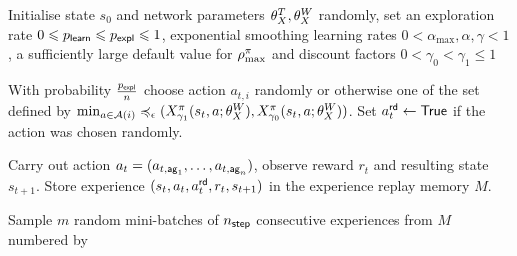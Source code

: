 \documentclass[envcountsame]{llncs}
\newcommand\MS[2][r]{\ifx t#1 \textcolor{blue}{[\textbf{MS:} #2]}
  \else \begin{center}\textcolor{blue}{\textbf{MS:} #2} \end{center} \fi}
\begin{document}


\begin{algorithm}[t!]
  \begin{algorithmic}[1]
    \State{}Initialise state \(s_{0}\) and network parameters \(\theta_X^{T}, \theta_X^{W}\) randomly,
    set an exploration rate \(0 \leqslant p_{\mathsf{learn}} \leqslant p_{\mathsf{expl}} \leqslant 1\), exponential
    smoothing learning rates \(0 < \alpha_{\max}, \alpha, \gamma < 1\), a sufficiently large default
    value for \(\rho_{\max}^{\pi}\) and discount factors \(0 < \gamma_{0} < \gamma_{1} \leqslant
    1\)
    \State{}%
    \begin{minipage}[t]{\dimexpr\textwidth-\leftmargin-\labelsep-\labelwidth-\leftmargin+2pt}
      With probability \(\frac{p_{\mathsf{expl}}}{n}\) choose action \(a_{t,i}\) randomly or otherwise one of
      the set defined by
      \(\min_{a \in \mathcal{A}(i)}\preccurlyeq_{\epsilon}(X^{\pi}_{\gamma_{1}}(s_{t},a; \theta_X^{W}{}),X^\pi_
      {\gamma_{0}}(s_{t},a; \theta_X^{W}{}))\). Set \(a_{t}^{\mathsf{rd}} \gets \mathsf{True}\) if the
      action was chosen randomly.
    \end{minipage}
    \EndFor{}
    \State{}%
    \begin{minipage}[t]{\dimexpr\textwidth-\leftmargin-\labelsep-\labelwidth}
      Carry out action \(a_{t}=(a_{t,\mathsf{ag}_{1}},\ldots,a_{t,\mathsf{ag}_{n}})\), observe reward
      \(r_{t}\) and resulting state \(s_{t+1}\). Store experience
      \((s_{t}, a_{t}, a_{t}^{\mathsf{rd}}, r_{t}, s_{t+1})\) in the experience replay memory \(M\).
    \end{minipage}
    \State{}%
    \begin{minipage}[t]{\dimexpr\textwidth-\leftmargin-\labelsep-\labelwidth-\leftmargin+2pt}
      Sample \(m\) random mini-batches of \(n_{\mathsf{step}}\) consecutive experiences from \(M\) numbered by

\end{minipage}
\end{algorithmic}
\end{algorithm}
\end{document}
